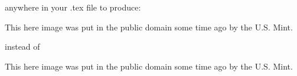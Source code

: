 \documentclass[pagesize=auto]{scrartcl}
\begin{document}
anywhere in your .tex file to produce:
\setcopyrightparstyle{%
\setlength{\rightskip}{0pt}
\setlength{\leftskip}{0pt}
}

\begin{center}
      {This here image was put in the public domain some time ago by the U.S. Mint.}
\end{center}

instead of 

\setcopyrightparstyle{%
\raggedright
}

\begin{center}
      {This here image was put in the public domain some time ago by the U.S. Mint.}
\end{center}
\end{document}
